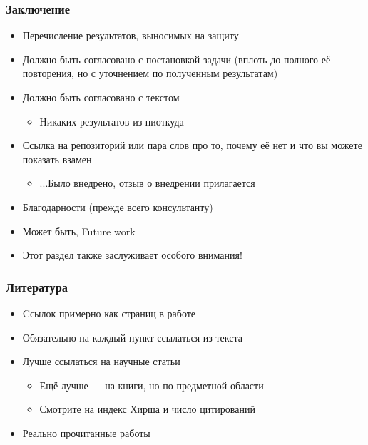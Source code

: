 \documentclass[xetex,mathserif,serif]{beamer}
\begin{document}
    \begin{frame}
        \frametitle{Заключение}
        \begin{itemize}
            \item Перечисление результатов, выносимых на защиту
            \item Должно быть согласовано с постановкой задачи (вплоть до полного её повторения, но с уточнением по полученным результатам)
            \item Должно быть согласовано с текстом
            \begin{itemize}
                \item Никаких результатов из ниоткуда
            \end{itemize}
            \item Ссылка на репозиторий или пара слов про то, почему её нет и что вы можете показать взамен
            \begin{itemize}
                \item ...Было внедрено, отзыв о внедрении прилагается
            \end{itemize}
            \item Благодарности (прежде всего консультанту)
            \item Может быть, Future work
            \item Этот раздел также заслуживает особого внимания!
        \end{itemize}
    \end{frame}

    \begin{frame}
        \frametitle{Литература}
        \begin{itemize}
            \item Cсылок примерно как страниц в работе
            \item Обязательно на каждый пункт ссылаться из текста
            \item Лучше ссылаться на научные статьи
            \begin{itemize}
                \item Ещё лучше --- на книги, но по предметной области
                \item Смотрите на индекс Хирша и число цитирований
            \end{itemize}
            \item Реально прочитанные работы
        \end{itemize}
    \end{frame}
\end{document}
